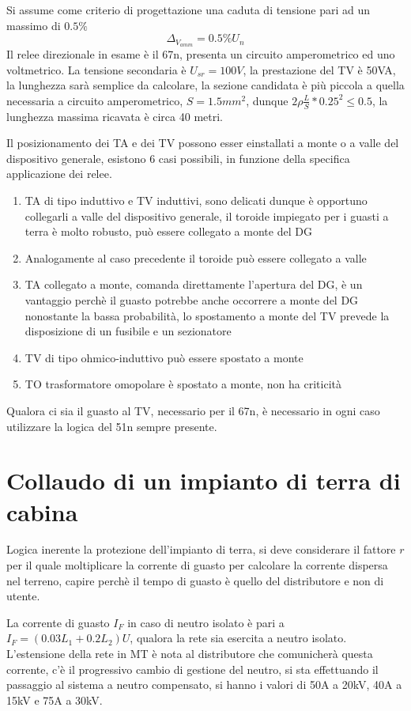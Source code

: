 
Si assume come criterio di progettazione una caduta di tensione pari ad un massimo di $0.5 \%$
$$
\Delta_{V_{amm}}  = 0.5\% U_n
$$
Il relee direzionale in esame è il 67n, presenta un circuito amperometrico ed uno voltmetrico.
La tensione secondaria è $U_{sr} = 100V$, la prestazione del TV è 50VA, la lunghezza sarà semplice da calcolare, la sezione candidata è più piccola a quella necessaria a circuito amperometrico, $S = 1.5 mm^2$, dunque
$2\rho \frac{L}{S}*0.25^2 \leq 0.5$, la lunghezza massima ricavata è circa 40 metri.

Il posizionamento dei TA e dei TV possono esser einstallati a monte o a valle del dispositivo generale, esistono 6 casi possibili, in funzione della specifica applicazione dei relee.

\begin{enumerate}
    \item TA di tipo induttivo e TV induttivi, sono delicati dunque è opportuno collegarli a valle del dispositivo generale, il toroide impiegato per i guasti a terra è molto robusto, può essere collegato a monte del DG
    \item Analogamente al caso precedente il toroide può essere collegato a valle
    \item TA collegato a monte, comanda direttamente l'apertura del DG, è un vantaggio perchè il guasto potrebbe anche occorrere a monte del DG nonostante la bassa probabilità, lo spostamento a monte del TV prevede la disposizione di un fusibile e un sezionatore
    \item TV di tipo ohmico-induttivo può essere spostato a monte
    \item TO trasformatore omopolare è spostato a monte, non ha criticità
\end{enumerate}
Qualora ci sia il guasto al TV, necessario per il 67n, è necessario in ogni caso utilizzare la logica del 51n sempre presente.

\section{Collaudo di un impianto di terra di cabina}
Logica inerente la protezione dell'impianto di terra, si deve considerare il fattore $r$ per il quale moltiplicare la corrente di guasto per calcolare la corrente dispersa nel terreno, capire perchè il tempo di guasto è quello del distributore e non di utente.

La corrente di guasto $I_F$ in caso di neutro isolato è pari a $I_F = (0.03L_1 + 0.2L_2)U$, qualora la rete sia esercita a neutro isolato. L'estensione della 
rete in MT è nota al distributore che comunicherà questa corrente, c'è il 
progressivo cambio di gestione del neutro, si sta effettuando il passaggio al 
sistema a neutro compensato, si hanno i valori di 50A a 20kV, 40A a 15kV e 75A 
a 30kV.

